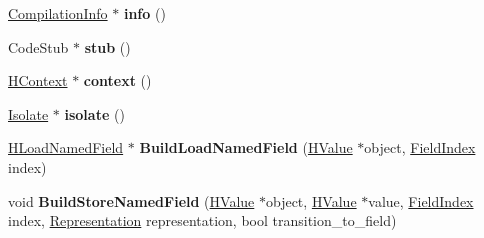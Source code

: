 \begin{DoxyCompactItemize}
\item 
\hyperlink{classv8_1_1internal_1_1_compilation_info}{Compilation\+Info} $\ast$ {\bfseries info} ()\hypertarget{classv8_1_1internal_1_1_code_stub_graph_builder_base_a8044e4cb18e93af955c07caea6405b01}{}\label{classv8_1_1internal_1_1_code_stub_graph_builder_base_a8044e4cb18e93af955c07caea6405b01}

\item 
Code\+Stub $\ast$ {\bfseries stub} ()\hypertarget{classv8_1_1internal_1_1_code_stub_graph_builder_base_af0fb8f86c282d4d9605d60117c01cae7}{}\label{classv8_1_1internal_1_1_code_stub_graph_builder_base_af0fb8f86c282d4d9605d60117c01cae7}

\item 
\hyperlink{classv8_1_1internal_1_1_h_context}{H\+Context} $\ast$ {\bfseries context} ()\hypertarget{classv8_1_1internal_1_1_code_stub_graph_builder_base_a480fcb4281ea8f6c9aa2bd1614cc93e3}{}\label{classv8_1_1internal_1_1_code_stub_graph_builder_base_a480fcb4281ea8f6c9aa2bd1614cc93e3}

\item 
\hyperlink{classv8_1_1internal_1_1_isolate}{Isolate} $\ast$ {\bfseries isolate} ()\hypertarget{classv8_1_1internal_1_1_code_stub_graph_builder_base_ae6251bb36a75ce9037af01f27c601dee}{}\label{classv8_1_1internal_1_1_code_stub_graph_builder_base_ae6251bb36a75ce9037af01f27c601dee}

\item 
\hyperlink{classv8_1_1internal_1_1_h_load_named_field}{H\+Load\+Named\+Field} $\ast$ {\bfseries Build\+Load\+Named\+Field} (\hyperlink{classv8_1_1internal_1_1_h_value}{H\+Value} $\ast$object, \hyperlink{classv8_1_1internal_1_1_field_index}{Field\+Index} index)\hypertarget{classv8_1_1internal_1_1_code_stub_graph_builder_base_a8547e90b4aa5429d61314a57c22efafb}{}\label{classv8_1_1internal_1_1_code_stub_graph_builder_base_a8547e90b4aa5429d61314a57c22efafb}

\item 
void {\bfseries Build\+Store\+Named\+Field} (\hyperlink{classv8_1_1internal_1_1_h_value}{H\+Value} $\ast$object, \hyperlink{classv8_1_1internal_1_1_h_value}{H\+Value} $\ast$value, \hyperlink{classv8_1_1internal_1_1_field_index}{Field\+Index} index, \hyperlink{classv8_1_1internal_1_1_representation}{Representation} representation, bool transition\+\_\+to\+\_\+field)\hypertarget{classv8_1_1internal_1_1_code_stub_graph_builder_base_ace36580a73b11016907ed3f209a1e487}{}\label{classv8_1_1internal_1_1_code_stub_graph_builder_base_ace36580a73b11016907ed3f209a1e487}


\end{DoxyCompactItemize}
